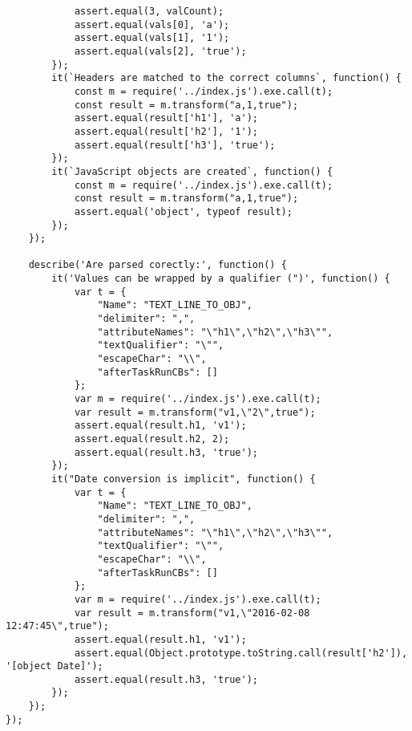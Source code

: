 \begin{verbatim}
            assert.equal(3, valCount);
            assert.equal(vals[0], 'a');
            assert.equal(vals[1], '1');
            assert.equal(vals[2], 'true');
        });
        it(`Headers are matched to the correct columns`, function() {
            const m = require('../index.js').exe.call(t);
            const result = m.transform("a,1,true");
            assert.equal(result['h1'], 'a');
            assert.equal(result['h2'], '1');
            assert.equal(result['h3'], 'true');
        });
        it(`JavaScript objects are created`, function() {
            const m = require('../index.js').exe.call(t);
            const result = m.transform("a,1,true");
            assert.equal('object', typeof result);
        });
    });

    describe('Are parsed corectly:', function() {
        it('Values can be wrapped by a qualifier (")', function() {
            var t = {
                "Name": "TEXT_LINE_TO_OBJ",
                "delimiter": ",",
                "attributeNames": "\"h1\",\"h2\",\"h3\"",
                "textQualifier": "\"",
                "escapeChar": "\\",
                "afterTaskRunCBs": []
            };
            var m = require('../index.js').exe.call(t);
            var result = m.transform("v1,\"2\",true");
            assert.equal(result.h1, 'v1');
            assert.equal(result.h2, 2);
            assert.equal(result.h3, 'true');
        });
        it("Date conversion is implicit", function() {
            var t = {
                "Name": "TEXT_LINE_TO_OBJ",
                "delimiter": ",",
                "attributeNames": "\"h1\",\"h2\",\"h3\"",
                "textQualifier": "\"",
                "escapeChar": "\\",
                "afterTaskRunCBs": []
            };
            var m = require('../index.js').exe.call(t);
            var result = m.transform("v1,\"2016-02-08 12:47:45\",true");
            assert.equal(result.h1, 'v1');
            assert.equal(Object.prototype.toString.call(result['h2']), '[object Date]');
            assert.equal(result.h3, 'true');
        });
    });
});
\end{verbatim}